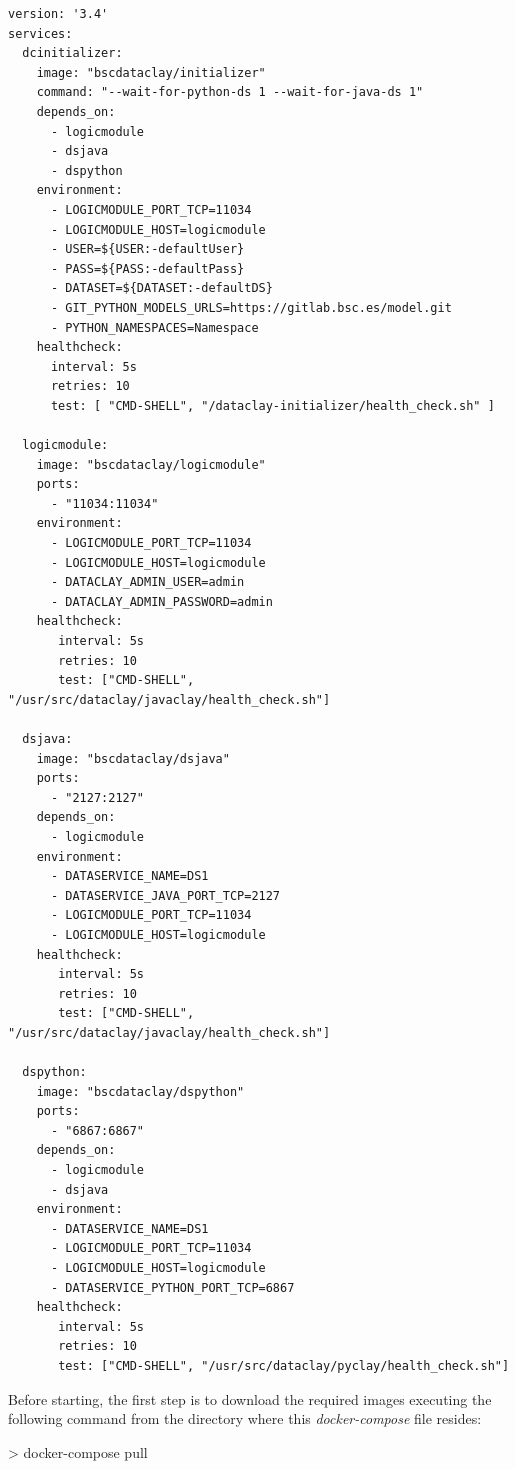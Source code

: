 \begin{tBox}
 \begin{lstlisting}[language=docker-compose-2, frame=none]
version: '3.4'
services:
  dcinitializer:
    image: "bscdataclay/initializer"
    command: "--wait-for-python-ds 1 --wait-for-java-ds 1"
    depends_on:
      - logicmodule
      - dsjava
      - dspython
    environment:
      - LOGICMODULE_PORT_TCP=11034
      - LOGICMODULE_HOST=logicmodule
      - USER=${USER:-defaultUser}
      - PASS=${PASS:-defaultPass}
      - DATASET=${DATASET:-defaultDS}
      - GIT_PYTHON_MODELS_URLS=https://gitlab.bsc.es/model.git
      - PYTHON_NAMESPACES=Namespace
    healthcheck:
      interval: 5s
      retries: 10
      test: [ "CMD-SHELL", "/dataclay-initializer/health_check.sh" ]

  logicmodule:
    image: "bscdataclay/logicmodule"
    ports:
      - "11034:11034"
    environment:
      - LOGICMODULE_PORT_TCP=11034
      - LOGICMODULE_HOST=logicmodule
      - DATACLAY_ADMIN_USER=admin
      - DATACLAY_ADMIN_PASSWORD=admin
    healthcheck:
       interval: 5s
       retries: 10
       test: ["CMD-SHELL", "/usr/src/dataclay/javaclay/health_check.sh"]
         
  dsjava:
    image: "bscdataclay/dsjava"
    ports:
      - "2127:2127"
    depends_on:
      - logicmodule
    environment:
      - DATASERVICE_NAME=DS1
      - DATASERVICE_JAVA_PORT_TCP=2127
      - LOGICMODULE_PORT_TCP=11034
      - LOGICMODULE_HOST=logicmodule
    healthcheck:
       interval: 5s
       retries: 10
       test: ["CMD-SHELL", "/usr/src/dataclay/javaclay/health_check.sh"]
       
  dspython:
    image: "bscdataclay/dspython"
    ports:
      - "6867:6867"
    depends_on:
      - logicmodule
      - dsjava
    environment:
      - DATASERVICE_NAME=DS1
      - LOGICMODULE_PORT_TCP=11034
      - LOGICMODULE_HOST=logicmodule
      - DATASERVICE_PYTHON_PORT_TCP=6867
    healthcheck:
       interval: 5s
       retries: 10
       test: ["CMD-SHELL", "/usr/src/dataclay/pyclay/health_check.sh"]
 \end{lstlisting}
\end{tBox}

Before starting, the first step is to download the required images executing the following command from the directory where this \textit{docker-compose} file resides:
\begin{tBox}
 \begin{bash}
  > docker-compose pull
 \end{bash}
\end{tBox}


